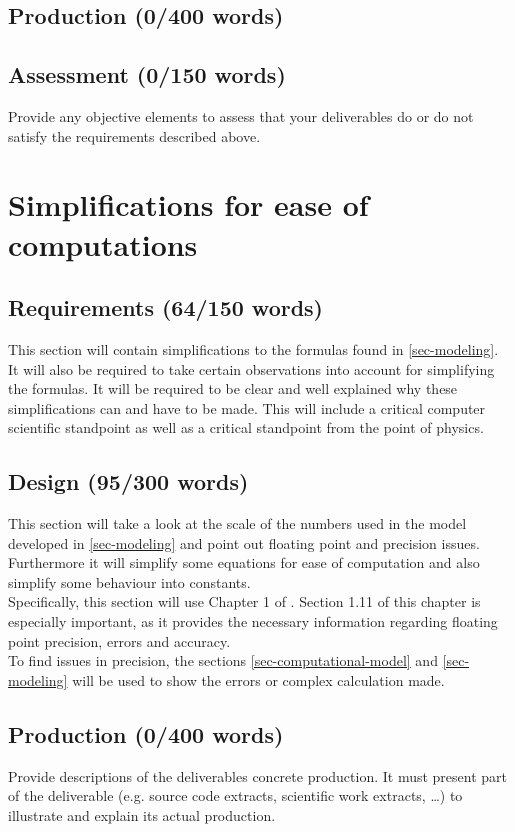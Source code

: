 \documentclass[conference,compsoc]{IEEEtran}
\begin{document}
\subsection{Production (0/400 words)}

\subsection{Assessment (0/150 words)}
Provide any objective elements to assess that your deliverables do or do not satisfy the requirements described above. 

\section{Simplifications for ease of computations}
\label{sec-simplify}
\subsection{Requirements (64/150 words)}
This section will contain simplifications to the formulas found in \ref{sec-modeling}.\\
It will also be required to take certain observations into account for simplifying the formulas. It will be required to be clear and well explained why these simplifications can and have to be made. This will include a critical computer scientific standpoint as well as a critical standpoint from the point of physics.
\subsection{Design (95/300 words)}
This section will take a look at the scale of the numbers used in the model developed in \ref{sec-modeling} and point out floating point and precision issues. Furthermore it will simplify some equations for ease of computation and also simplify some behaviour into constants.\\
Specifically, this section will use Chapter 1 of \cite{ComputationalModelsIntroduction}. Section 1.11 of this chapter is especially important, as it provides the necessary information regarding floating point precision, errors and accuracy. \\
To find issues in precision, the sections \ref{sec-computational-model} and \ref{sec-modeling} will be used to show the errors or complex calculation made.
\subsection{Production (0/400 words)}
Provide descriptions of the deliverables concrete production. It must present part of the deliverable (e.g. source code extracts, scientific work extracts, \ldots) to illustrate and explain its actual production.
\end{document}
